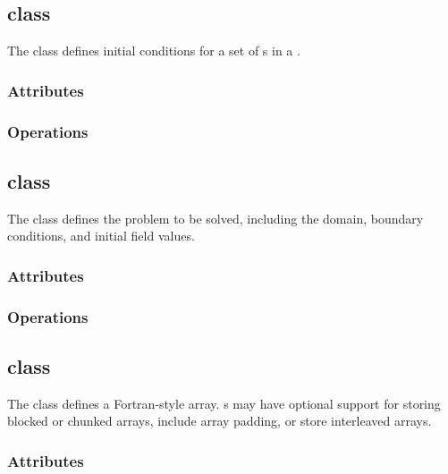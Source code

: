\documentclass{article}
\begin{document}
\subsection{ class}

The  class defines initial conditions for a set of
s in a .


\subsubsection{Attributes}

\subsubsection{Operations}

\subsection{ class}

The  class defines the problem to be solved, including
the domain, boundary conditions, and initial field values.


\subsubsection{Attributes}

\subsubsection{Operations}

\subsection{ class}

The  class defines a Fortran-style array.  s may
have optional support for storing blocked or chunked arrays, include
array padding, or store interleaved arrays.


\subsubsection{Attributes}
\end{document}
